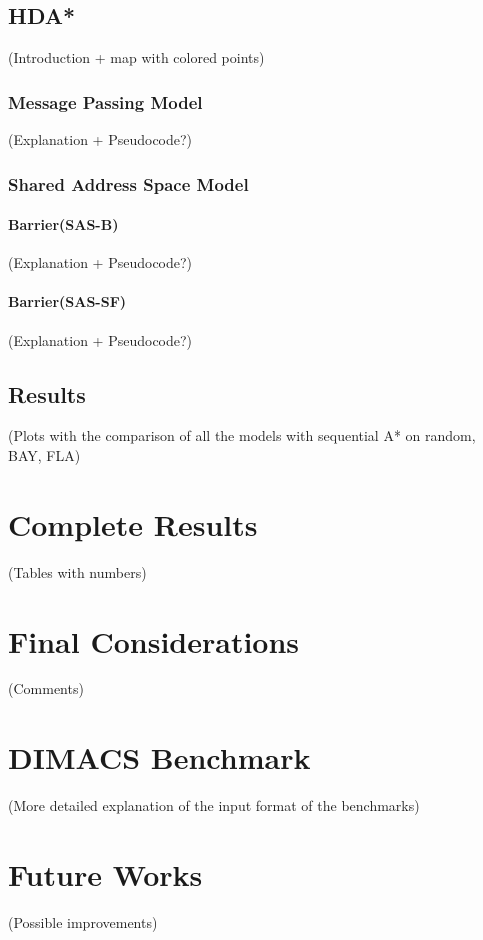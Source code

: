 \documentclass[twocolumn, switch]{article} %
\begin{document}
\subsection{HDA*}
(Introduction + map with colored points)
\subsubsection{Message Passing Model}
(Explanation + Pseudocode?)
\subsubsection{Shared Address Space Model}
\paragraph{Barrier(SAS-B)}
(Explanation + Pseudocode?)
\paragraph{Barrier(SAS-SF)}
(Explanation + Pseudocode?)
\subsection{Results}
(Plots with the comparison of all the models with sequential A* on
random, BAY, FLA)

\section{Complete Results}
(Tables with numbers)

\section{Final Considerations}
(Comments)

\section{DIMACS Benchmark}
(More detailed explanation of the input format of the benchmarks)

\section{Future Works}
(Possible improvements)




\end{document}
